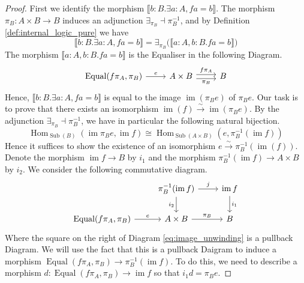 \documentclass{tac}
\newcommand{\lto}{\longrightarrow}
\begin{document}
	\begin{proof}
		First we identify the morphism $\llbracket b:B. \exists a:A, fa = b\rrbracket$. The morphism $\pi_B: A \times B \lto B$ induces an adjunction $\exists_{\pi_B} \dashv\pi_B^{-1}$, and by Definition \ref{def:internal_logic_pure} we have
		\begin{equation}
			\llbracket b:B. \exists a:A, fa = b\rrbracket = \exists_{\pi_B} \big(\llbracket a:A, b:B. fa = b\rrbracket\big)
		\end{equation}
		The morphism $\llbracket a:A, b:B. fa = b\rrbracket$ is the Equaliser in the following Diagram.
		\begin{equation}
			\begin{tikzcd}
				\operatorname{Equal}(f\pi_A,\pi_B)\arrow[r,"{e}"] & A \times B\arrow[r,shift left,"{f\pi_A}"]\arrow[r,shift right,swap,"{\pi_B}"] & B
			\end{tikzcd}
		\end{equation}
		Hence, $\llbracket b:B. \exists a:A, fa = b\rrbracket$ is equal to the image $\operatorname{im}(\pi_Be)$ of $\pi_Be$. Our task is to prove that there exists an isomorphism $\operatorname{im}(f) \stackrel{\sim}{\lto} \operatorname{im}(\pi_Be)$. By the adjunction $\exists_{\pi_B} \dashv \pi_B^{-1}$, we have in particular the following natural bijection.
		\begin{equation}
			\operatorname{Hom}_{\operatorname{Sub}(B)}(\operatorname{im}\pi_B e, \operatorname{im}f) \cong \operatorname{Hom}_{\operatorname{Sub}(A \times B)}(e, \pi_B^{-1}(\operatorname{im}f))
		\end{equation}
		Hence it suffices to show the existence of an isomorphism $e \stackrel{\sim}{\lto} \pi_B^{-1}(\operatorname{im}(f))$. Denote the morphism $\operatorname{im}f \lto B$ by $i_1$ and the morphism $\pi_B^{-1}(\operatorname{im}f) \lto A \times B$ by $i_2$. We consider the following commutative diagram.
		\begin{equation}\label{eq:image_unwinding}
			\begin{tikzcd}
				& \pi_B^{-1}(\operatorname{im}f)\arrow[r,"{j}"]\arrow[d,swap,"{i_2}"] & \operatorname{im}f\arrow[d,"{i_1}"]\\
				\operatorname{Equal}(f\pi_A,\pi_B)\arrow[r,"e"] & A \times B\arrow[r,"{\pi_B}"] & B
			\end{tikzcd}
		\end{equation}
		Where the square on the right of Diagram \eqref{eq:image_unwinding} is a pullback Diagram. We will use the fact that this is a pullback Daigram to induce a morphism $\operatorname{Equal}(f\pi_A,\pi_B) \lto \pi_B^{-1}(\operatorname{im}f)$. To do this, we need to describe a morphism $d: \operatorname{Equal}(f\pi_A,\pi_B) \lto \operatorname{im}f$ so that $i_1 d = \pi_B e$.
		

\end{proof}
\end{document}
